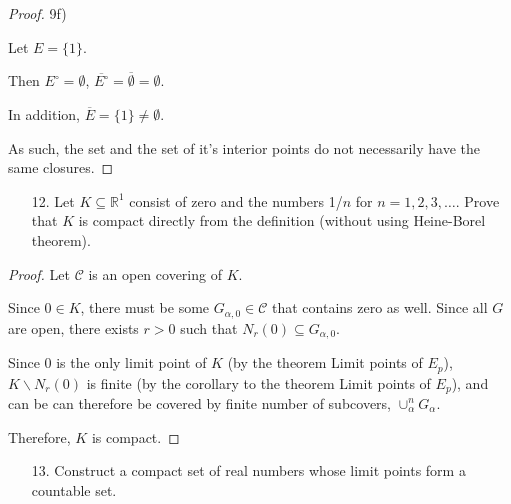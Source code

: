 \documentclass[10pt]{article}
\theoremstyle{definition}
\theoremstyle{plain}
\newcommand{\R}{\mathbb{R}}
\begin{document}
\begin{proof}
9f)

Let $E=\{1\}$.

Then $E^\circ = \emptyset$, $\overline{E^\circ} = \overline{\emptyset} = \emptyset$.

In addition, $\overline{E} = \{1\} \neq \emptyset$.

As such, the set and the set of it's interior points do not necessarily have the same closures.
\end{proof}




\pagebreak




\begin{enumerate}
\item[12.] Let $K\subseteq \R^1$ consist of zero and the numbers 1/$n$ for $n=1,2,3,\dots.$ Prove that $K$ is compact directly from the definition (without using Heine-Borel theorem).
\end{enumerate}

\begin{proof}
Let $\mathcal{C}$ is an open covering of $K$.

Since $0\in K$, there must be some $G_{\alpha,0} \in\mathcal{C}$ that contains zero as well. Since all $G$ are open, there exists $r>0$ such that $N_r (0)\subseteq G_{\alpha,0}$.

Since 0 is the only limit point of $K$ (by the theorem Limit points of $E_p$), $K\backslash N_r(0)$ is finite (by the corollary to the theorem Limit points of $E_p$), and can be can therefore be covered by finite number of subcovers, $\cup_\alpha^n G_\alpha$.

Therefore, $K$ is compact.
\end{proof}




\pagebreak




\begin{enumerate}
\item[13.] Construct a compact set of real numbers whose limit points form a countable set.
\end{enumerate}
\end{document}
